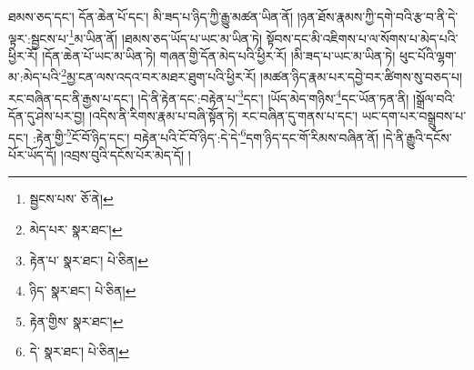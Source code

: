 ཐམས་ཅད་དང་། དོན་ཆེན་པོ་དང་། མི་ཟད་པ་ཉིད་ཀྱི་རྒྱུ་མཚན་ཡིན་ནོ། །ཉན་ཐོས་རྣམས་ཀྱི་དགེ་བའི་རྩ་བ་ནི་དེ་ལྟར་:སྦྱངས་པ་\footnote{སྦྱངས་པས་  ཅོ་ནེ། }མ་ཡིན་ནོ། །ཐམས་ཅད་ཡོད་པ་ཡང་མ་ཡིན་ཏེ། སྟོབས་དང་མི་འཇིགས་པ་ལ་སོགས་པ་མེད་པའི་ཕྱིར་རོ། །དོན་ཆེན་པོ་ཡང་མ་ཡིན་ཏེ། གཞན་གྱི་དོན་མེད་པའི་ཕྱིར་རོ། །མི་ཟད་པ་ཡང་མ་ཡིན་ཏེ། ཕུང་པོའི་ལྷག་མ་:མེད་པའི་\footnote{མེད་པར་  སྣར་ཐང་། }མྱ་ངན་ལས་འདའ་བར་མཐར་ཐུག་པའི་ཕྱིར་རོ། །མཚན་ཉིད་རྣམ་པར་དབྱེ་བར་ཚིགས་སུ་བཅད་པ། རང་བཞིན་དང་ནི་རྒྱས་པ་དང་། །དེ་ནི་རྟེན་དང་:བརྟེན་པ་\footnote{རྟེན་པ་  སྣར་ཐང་།  པེ་ཅིན། }དང་། །ཡོད་མེད་གཉིས་\footnote{ཉིད་  སྣར་ཐང་།  པེ་ཅིན། }དང་ཡོན་ཏན་ནི། །སྒྲོལ་བའི་དོན་དུ་ཤེས་པར་བྱ། །འདིས་ནི་རིགས་རྣམ་པ་བཞི་སྟོན་ཏེ། རང་བཞིན་དུ་གནས་པ་དང་། ཡང་དག་པར་བསྒྲུབས་པ་དང་། :རྟེན་གྱི་\footnote{རྟེན་གྱིས་  སྣར་ཐང་། }ངོ་བོ་ཉིད་དང་། བརྟེན་པའི་ངོ་བོ་ཉིད་:དེ་དེ་\footnote{དེ་  སྣར་ཐང་།  པེ་ཅིན། }དག་ཉིད་དང་གོ་རིམས་བཞིན་ནོ། །དེ་ནི་རྒྱུའི་དངོས་པོར་ཡོད་དོ། །འབྲས་བུའི་དངོས་པོར་མེད་དོ། །
